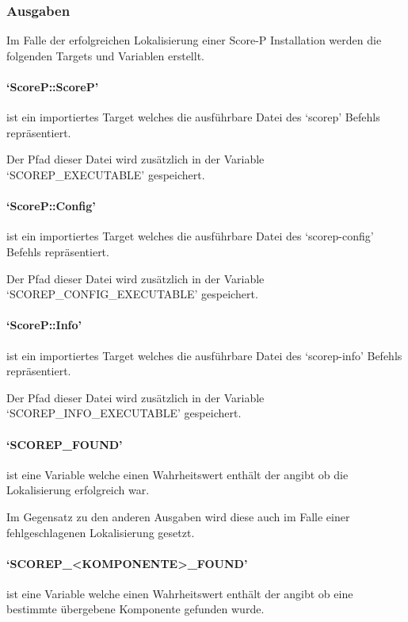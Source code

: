 \documentclass[german,proseminar,hyperref,utf8]{zihpub}
\begin{document}
    \subsubsection{Ausgaben}
    Im Falle der erfolgreichen Lokalisierung einer Score-P Installation werden die folgenden
    Targets und Variablen erstellt.

    \paragraph{`ScoreP::ScoreP'} ist ein importiertes Target welches die ausführbare Datei
    des `scorep' Befehls repräsentiert.

    Der Pfad dieser Datei wird zusätzlich in der Variable `SCOREP\_EXECUTABLE' gespeichert.

    \paragraph{`ScoreP::Config'} ist ein importiertes Target welches die ausführbare Datei
    des `scorep-config' Befehls repräsentiert.

    Der Pfad dieser Datei wird zusätzlich in der Variable `SCOREP\_CONFIG\_EXECUTABLE' gespeichert.

    \paragraph{`ScoreP::Info'} ist ein importiertes Target welches die ausführbare Datei
    des `scorep-info' Befehls repräsentiert.

    Der Pfad dieser Datei wird zusätzlich in der Variable `SCOREP\_INFO\_EXECUTABLE' gespeichert.

    \paragraph{`SCOREP\_FOUND'} ist eine Variable welche einen Wahrheitswert enthält der angibt
    ob die Lokalisierung erfolgreich war.

    Im Gegensatz zu den anderen Ausgaben wird diese auch im Falle einer fehlgeschlagenen Lokalisierung
    gesetzt.

    \paragraph{`SCOREP\_<KOMPONENTE>\_FOUND'} ist eine Variable welche einen Wahrheitswert enthält
    der angibt ob eine bestimmte übergebene Komponente gefunden wurde.
\end{document}
